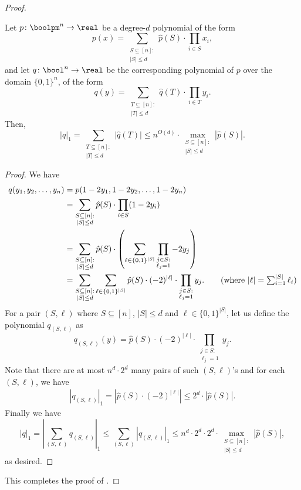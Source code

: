 \begin{proof}
    	\begin{claim}\label{claim:prg-magnitude}
    		Let $p\colon\boolpm^{n}\to\real$ be a degree-$d$ polynomial of the form
    		\[
    			p(x)=\sum_{\substack{S\subseteq[n]: \\ |S|\leq d}} \hat{p}(S)\cdot \prod_{i\in S} x_i,
    		\]
    		and let $q\colon\bool^{n}\to\real$ be the corresponding polynomial of $p$ over the domain $\{0,1\}^n$, of the form
    		\[
    			q(y)=\sum_{\substack{T\subseteq[n]: \\ |T|\leq d}} \hat{q}(T)\cdot \prod_{i\in T} y_i.
    		\]
    		Then,
    		\[
    			|q|_1 = \sum_{\substack{T\subseteq[n]: \\ |T|\leq d}} |\hat{q}(T)| \leq n^{O(d)}\cdot \max_{\substack{S\subseteq[n]: \\ |S|\leq d}} |\hat{p}(S)|.
    		\]
    	\end{claim}
    	
    	\begin{proof}\renewcommand{\qedsymbol}{$\square$ (\Cref{claim:prg-magnitude})}
    		We have
    		\begin{align*}
    			q(y_1,y_2,\dots,y_n) &= p(1-2y_1,1-2y_2,\dots,1-2y_n)\\
    			&= \sum_{\substack{S\subseteq[n]: \\ |S|\leq d}} \hat{p}(S)\cdot \prod_{i\in S} (1-2y_i)\\
    			&= \sum_{\substack{S\subseteq[n]: \\ |S|\leq d}} \hat{p}(S)\cdot \left(\sum_{\ell\in \{0,1\}^{|S|}}\prod_{\substack{j\in S:\\ \ell_j=1}}-2y_j \right)\\
    			&= \sum_{\substack{S\subseteq[n]: \\ |S|\leq d}} \sum_{\ell\in \{0,1\}^{|S|}} \hat{p}(S)\cdot(-2)^{|\ell|}\cdot \prod_{\substack{j\in S:\\ \ell_j=1}} y_j. \tag{where $|\ell| = \sum_{i=1}^{|S|}\ell_i$}
    		\end{align*}
    		For a pair $(S,\ell)$ where $S \subseteq[n]$, $|S|\leq d$ and $\ell\in\{0,1\}^{|S|}$, let us define the polynomial $q_{(S,\ell)}$ as
    		\[
    			q_{(S,\ell)}(y)= \hat{p}(S)\cdot(-2)^{|\ell|}\cdot \prod_{\substack{j\in S:\\ \ell_j=1}} y_j.
    		\]
    		Note that there are at most $n^{d}\cdot2^{d}$ many pairs of such $(S,\ell)$'s and for each $(S,\ell)$, we have
    		\begin{align*}
    			|q_{(S,\ell)}|_1 = \left|\hat{p}(S)\cdot(-2)^{|\ell|}\right|\leq 2^{d}\cdot |\hat{p}(S)|.
    		\end{align*}
    	    Finally we have
    		\[
    			|q|_1 = \left|\sum_{(S,\ell)} q_{(S,\ell)}\right|_1\leq \sum_{(S,\ell)} |q_{(S,\ell)}|_1\leq n^{d}\cdot 2^d \cdot 2^d \cdot \max_{\substack{S\subseteq[n]: \\ |S|\leq d}} |\hat{p}(S)|,
    		\]
    		as desired.
    	\end{proof}
    	
    	This completes the proof of .
	\end{proof}

